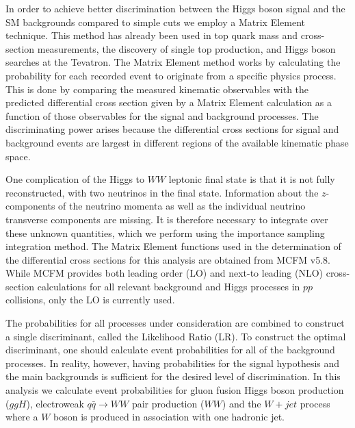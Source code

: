 In order to achieve better discrimination between the Higgs boson signal and the SM backgrounds
compared to simple cuts we employ a Matrix Element technique. 
This method has already been used in top quark mass and cross-section 
measurements, the discovery of single top production, and Higgs boson searches at the Tevatron.  
The Matrix Element method works by calculating the probability for each recorded
event to originate from a specific physics process.
This is done by comparing the measured kinematic observables with the predicted
differential cross section given by a Matrix Element calculation
as a function of those observables for the signal and background processes.
The discriminating power arises because the differential cross sections for 
signal and background events are largest in different regions of the available
kinematic phase space. 

One complication of the Higgs to $WW$ leptonic final state is that it is not fully 
reconstructed, with two neutrinos in the final state. 
Information about the $z$-components of the neutrino momenta as well as the individual 
neutrino transverse components are missing. It is therefore necessary to integrate 
over these unknown quantities, which we perform using the importance sampling 
integration method.
The Matrix Element functions used in the determination of the differential cross sections
for this analysis are obtained from  MCFM v5.8.  While MCFM 
provides both leading order (LO) and next-to leading (NLO) cross-section calculations for 
all relevant background and Higgs processes in $pp$ collisions, only the
LO is currently used.

The probabilities for all processes under consideration are combined 
to construct a single discriminant, called the Likelihood Ratio (LR).  
To construct the optimal discriminant, one should calculate 
event probabilities for all of the background processes. In reality, however, having 
probabilities for the signal hypothesis and the main backgrounds is sufficient for the 
desired level of discrimination. In this analysis we calculate event probabilities 
for gluon fusion Higgs boson production ($ggH$), electroweak $q\bar{q}\rightarrow WW$ pair 
production ($WW$) and the $W+jet$ process where a $W$ boson is produced in association with one hadronic jet. 


